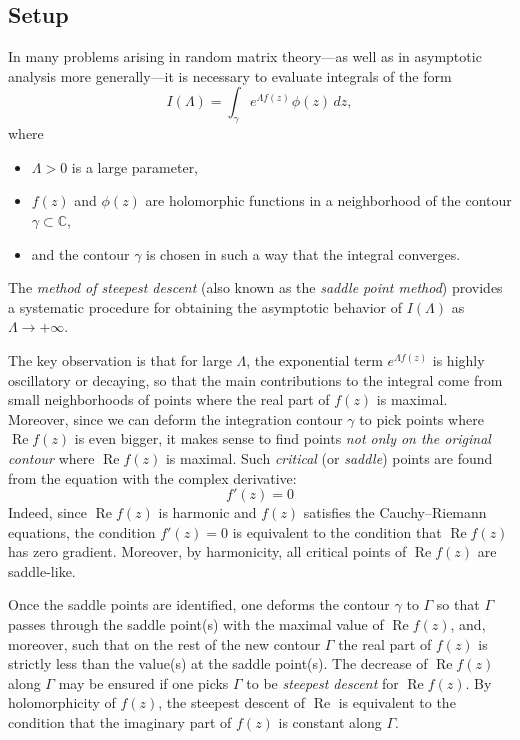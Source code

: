 \documentclass[letterpaper,11pt,oneside,reqno]{book}
\numberwithin{equation}{chapter}  %
\newcommand{\ssp}{\hspace{1pt}}
\theoremstyle{definition}
\begin{document}
\subsection{Setup}

In many problems arising in random matrix theory—as well as in asymptotic analysis more generally—it is necessary to evaluate integrals of the form
\begin{equation}
	\label{lecture6:eq:general-integral}
	I(\Lambda)=\int_{\gamma} e^{\Lambda f(z)}\ssp \phi(z)\,dz,
\end{equation}
where
\begin{itemize}
	\item $\Lambda>0$ is a large parameter,
	\item $f(z)$ and $\phi(z)$ are holomorphic functions in a neighborhood of the contour $\gamma\subset\mathbb{C}$,
	\item and the contour $\gamma$ is chosen in such a way that the integral converges.
\end{itemize}
The \emph{method of steepest descent} (also known as the \emph{saddle point method}) provides a systematic procedure for obtaining the asymptotic behavior of $I(\Lambda)$ as $\Lambda\to+\infty$.

The key observation is that for large $\Lambda$, the
exponential term $e^{\Lambda f(z)}$ is highly oscillatory or
decaying, so that the main contributions to the integral
come from small neighborhoods of points where the real part
of $f(z)$ is maximal.
Moreover, since we can deform the integration contour $\gamma$
to pick points where $\operatorname{Re}f(z)$ is even bigger, it makes sense to find
points \emph{not only on the original contour}
where $\operatorname{Re}f(z)$ is maximal.
Such \emph{critical} (or \emph{saddle}) points are
found from the equation with the complex derivative:
\begin{equation*}
	f'(z)=0
\end{equation*}
Indeed, since $\operatorname{Re}f(z)$
is harmonic and $f(z)$ satisfies the Cauchy--Riemann equations,
the condition $f'(z)=0$ is equivalent to the condition that $\operatorname{Re}f(z)$
has zero gradient. Moreover, by harmonicity, all critical points of
$\operatorname{Re}f(z)$ are saddle-like.

Once the saddle points are identified, one deforms the
contour $\gamma$ to $\Gamma$ so that $\Gamma$ passes
through the saddle point(s)
with the maximal value of $\operatorname{Re}f(z)$, and, moreover,
such that on the rest of the new contour $\Gamma$ the
real part of $f(z)$ is strictly less than the value(s) at the saddle point(s).
The decrease of $\operatorname{Re}f(z)$ along $\Gamma$ may be ensured
if one picks $\Gamma$ to be \emph{steepest descent} for $\operatorname{Re}f(z)$.
By holomorphicity of $f(z)$, the steepest descent
of $\operatorname{Re}$ is equivalent to the condition that
the imaginary part of $f(z)$ is constant along $\Gamma$.
\end{document}
